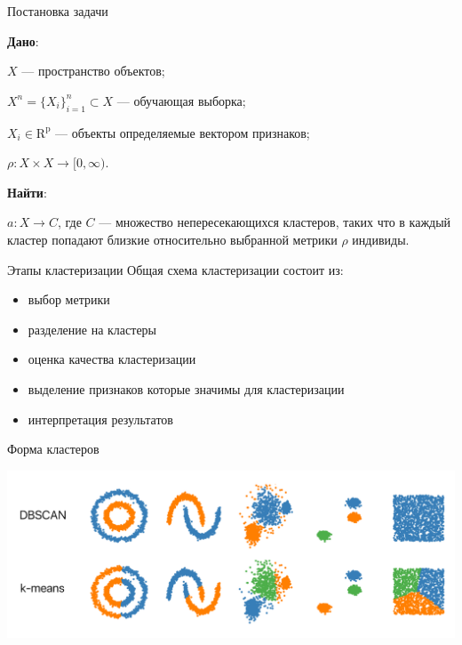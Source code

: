 \documentclass{beamer}
\begin{document}

\begin{frame}{Постановка задачи}

\textbf{Дано}:

$X$ --- пространство объектов;

$X^{n}  = \{X_{i}\}_{i = 1}^{n} \subset X$ --- обучающая выборка;

$X_{i} \in \mathrm{R^{p}}$ --- объекты определяемые вектором признаков;

$\rho : X \times X \rightarrow [0,\infty).$

\textbf{Найти}:

$a: X \rightarrow C$, где $C$ --- множество непересекающихся кластеров, таких что в каждый кластер попадают близкие относительно выбранной метрики $\rho$ индивиды.

\end{frame}


\begin{frame}{Этапы кластеризации}
Общая схема кластеризации состоит из: 

\begin{itemize}
    
    \item выбор метрики
    
    \item разделение на кластеры
    
    \item оценка качества кластеризации
    
    \item выделение признаков которые значимы для кластеризации
    
    \item интерпретация результатов

    \end{itemize}
   
   
\end{frame}


\begin{frame}{Форма кластеров}

    \includegraphics[scale = 0.25]{shape.png}
    
    \end{frame}
\end{document}
